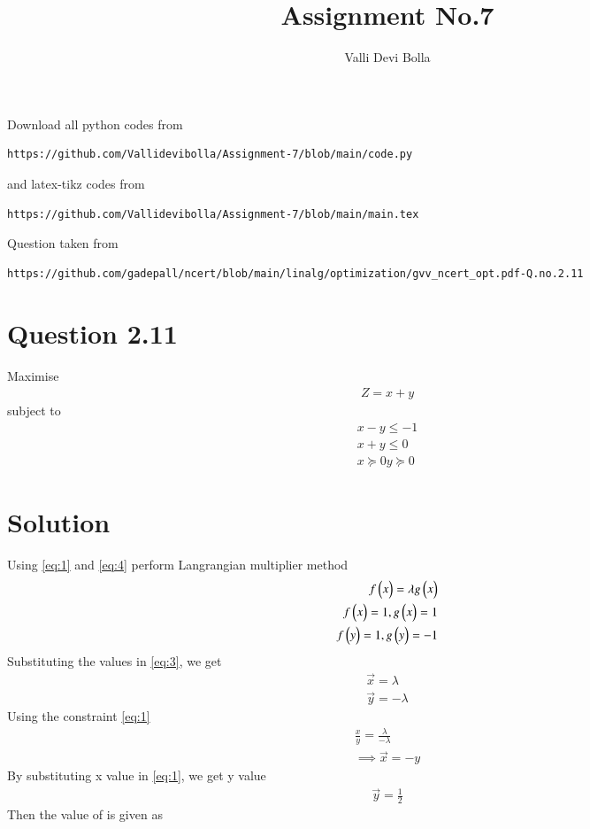 \documentclass[journal,12pt,twocolumn]{IEEEtran}
\begin{document}
\def\rightbox#1{\makebox[0in][r]{#1}}
\def\centbox#1{\makebox[0in]{#1}}
\def\topbox#1{\raisebox{-\baselineskip}[0in][0in]{#1}}
\def\midbox#1{\raisebox{-0.5\baselineskip}[0in][0in]{#1}}
\vspace{3cm}
\title{Assignment No.7}
\author{Valli Devi Bolla}
\maketitle
\newpage
\bigskip
\renewcommand{\thefigure}{\theenumi}
\renewcommand{\thetable}{\theenumi}
Download all python codes from
\begin{lstlisting}
https://github.com/Vallidevibolla/Assignment-7/blob/main/code.py
\end{lstlisting}
%
and latex-tikz codes from
%
\begin{lstlisting}
https://github.com/Vallidevibolla/Assignment-7/blob/main/main.tex
\end{lstlisting}
%
Question taken from
\begin{lstlisting}
https://github.com/gadepall/ncert/blob/main/linalg/optimization/gvv_ncert_opt.pdf-Q.no.2.11
\end{lstlisting}
%
%
\section{Question 2.11}
Maximise
\begin{align}\label{eq:4}
Z = x + y  
\end{align}
subject to
\begin{align}\label{eq:1}
x-y \leq -1 \\
x+y \leq 0 \label{eq:2}\\
x \succeq 0
y \succeq 0
\end{align}
\section{Solution}
Using \eqref{eq:1} and \eqref{eq:4} perform
Langrangian multiplier method
\begin{align}\label{eq:3}
f\begin{pmatrix}x\end{pmatrix}=\lambda g\begin{pmatrix}x\end{pmatrix}  \\
f\begin{pmatrix}x\end{pmatrix}=1, g\begin{pmatrix}x\end{pmatrix}=1\\
f\begin{pmatrix}y\end{pmatrix}=1, g\begin{pmatrix}y\end{pmatrix}=-1
\end{align}
Substituting the values in \eqref{eq:3}, we get
\begin{align}
\vec{x}=\lambda   \\ 
\vec{y}=-\lambda  
\end{align}
Using the constraint \eqref{eq:1}
\begin{align}
\frac{x}{y}=\frac{\lambda}{-\lambda}\\
\implies\vec{x}=-y
\end{align}
By substituting x value in \eqref{eq:1}, we get y value
\begin{align}
\vec{y}=\frac{1}{2}
\end{align}
Then the value of \lambda is given as
\end{document}
